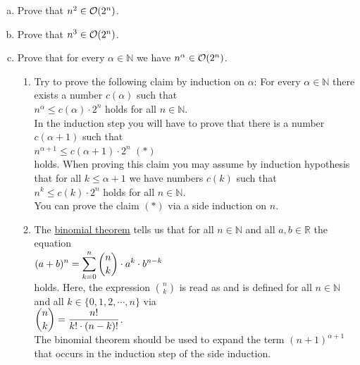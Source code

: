 \exercise
\begin{enumerate}[(a)]
\item Prove that $n^2 \in \mathcal{O}(2^n)$. 
\item Prove that $n^3 \in \mathcal{O}(2^n)$. 
\item Prove that for every $\alpha \in \mathbb{N}$ we have  $n^\alpha \in \mathcal{O}(2^n)$. 
      
      \hint
      \begin{enumerate}[1.]
      \item Try to prove the following claim by induction on $\alpha$:  For every $\alpha \in \mathbb{N}$
            there exists a number $c(\alpha)$ such that
            \\[0.2cm]
            \hspace*{1.3cm}
            $n^\alpha \leq c(\alpha) \cdot 2^n$ \quad holds for all $n \in \mathbb{N}$.
            \\[0.2cm]
            In the induction step you will have to prove that there is a number $c(\alpha+1)$ such that
            \\[0.2cm]
            \hspace*{1.3cm}
            $n^{\alpha+1} \leq c(\alpha+1) \cdot 2^n$ \hspace*{\fill} $(*)$
            \\[0.2cm]
            holds.  When proving this claim you may assume by induction hypothesis that for all 
            $k \leq \alpha+1$ we have numbers $c(k)$ such that
            \\[0.2cm]
            \hspace*{1.3cm}
            $n^{k} \leq c(k) \cdot 2^n$ \quad holds for all $n \in \mathbb{N}$.
            \\[0.2cm]
            You can prove the claim $(*)$ via a side induction on $n$.
      \item The \href{https://en.wikipedia.org/wiki/Binomial_theorem}{binomial theorem} tells
            us that for all $n \in \mathbb{N}$ and all $a,b \in \mathbb{R}$ the equation
            \\[0.2cm]
            \hspace*{1.3cm}
            $\displaystyle (a+b)^n = \sum\limits_{k=0}^n {n \choose k} \cdot a^k \cdot b^{n-k}$
            \\[0.2cm]
            holds.  Here, the expression ${n \choose k}$ is read as  and is
            defined for all $n \in \mathbb{N}$ and all $k \in \{0, 1, 2, \cdots, n\}$ via
            \\[0.2cm]
            \hspace*{1.3cm}
            $\displaystyle {n \choose k} = \frac{n!}{k! \cdot (n-k)!}$.
            \\[0.2cm]
            The binomial theorem should be used to expand the term $(n+1)^{\alpha + 1}$ that occurs
            in the induction step of the side induction.  \eox
      \end{enumerate}
\end{enumerate}



